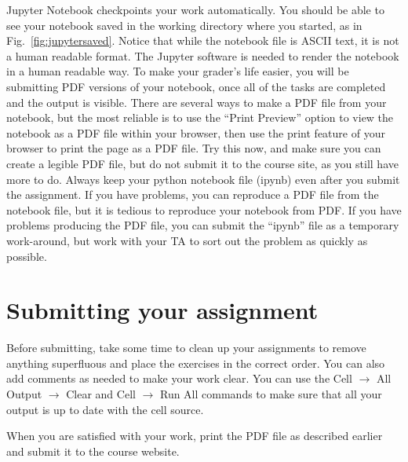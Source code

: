 Jupyter Notebook checkpoints your work automatically.  You should be
able to see your notebook saved in the working directory where you
started, as in Fig.~\ref{fig:jupytersaved}.  Notice that while the
notebook file is ASCII text, it is not a human readable format.  The
Jupyter software is needed to render the notebook in a human readable
way.  To make your grader's life easier, you will be submitting PDF
versions of your notebook, once all of the tasks are completed and the
output is visible.  There are several ways to make a PDF file from
your notebook, but the most reliable is to use the ``Print Preview''
option to view the notebook as a PDF file within your browser, then
use the print feature of your browser to print the page as a PDF file.
Try this now, and make sure you can create a legible PDF file, but do
not submit it to the course site, as you still have more to do.
Always keep your python notebook file (ipynb) even after you submit
the assignment.  If you have problems, you can reproduce a PDF file
from the notebook file, but it is tedious to reproduce your notebook
from PDF.  If you have problems producing the PDF file, you can submit
the ``ipynb'' file as a temporary work-around, but work with your TA
to sort out the problem as quickly as possible.

\section{Submitting your assignment}

Before submitting, take some time to clean up your assignments to
remove anything superfluous and place the exercises in the correct
order.  You can also add comments as needed to make your work clear.
You can use the Cell $\to$ All Output $\to$ Clear and Cell $\to$ Run
All commands to make sure that all your output is up to date with the
cell source.

When you are satisfied with your work, print the PDF file as described
earlier and submit it to the course website.









